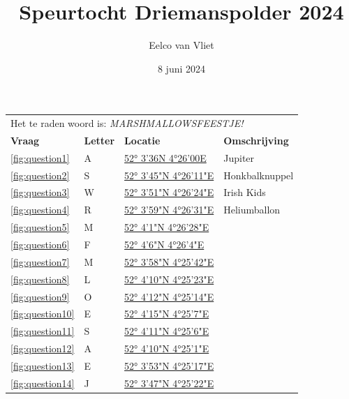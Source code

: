 \documentclass{article}
\title{Speurtocht Driemanspolder 2024}
\author{Eelco van Vliet}
\date{8 juni 2024}
\newcommand{\locone}{52° 3'36N 4°26'00E}
\newcommand{\urlone}{https://forms.gle/88Jf8wcjFSU8aojt8}
\newcommand{\letterone}{A}
\newcommand{\noteone}{Jupiter}
\newcommand{\loctwo}{52° 3'45"N 4°26'11"E}
\newcommand{\urltwo}{https://forms.gle/jwE6WMcVdYzMEdi86}
\newcommand{\lettertwo}{S}
\newcommand{\notetwo}{Honkbalknuppel}
\newcommand{\locthree}{52° 3'51"N 4°26'24"E}
\newcommand{\urlthree}{https://forms.gle/kxh8LWZneB8L2Z3z6}
\newcommand{\letterthree}{W}
\newcommand{\notethree}{Irish Kids}
\newcommand{\locfour}{52° 3'59"N 4°26'31"E}
\newcommand{\urlfour}{https://forms.gle/V9HNHxqCGrrNP5G88}
\newcommand{\letterfour}{R}
\newcommand{\notefour}{Heliumballon}
\newcommand{\locfive}{52° 4'1"N 4°26'28"E}
\newcommand{\urlfive}{https://example.com}
\newcommand{\letterfive}{M}
\newcommand{\notefive}{}
\newcommand{\locsix}{52° 4'6"N 4°26'4"E}
\newcommand{\urlsix}{https://example.com}
\newcommand{\lettersix}{F}
\newcommand{\notesix}{}
\newcommand{\locseven}{52° 3'58"N   4°25'42"E}
\newcommand{\urlseven}{https://example.com}
\newcommand{\letterseven}{M}
\newcommand{\noteseven}{}
\newcommand{\loceight}{52° 4'10"N   4°25'23"E}
\newcommand{\urleight}{https://example.com}
\newcommand{\lettereight}{L}
\newcommand{\noteeight}{}
\newcommand{\locnine}{52° 4'12"N  4°25'14"E}
\newcommand{\urlnine}{https://example.com}
\newcommand{\letternine}{O}
\newcommand{\notenine}{}
\newcommand{\locten}{52° 4'15"N   4°25'7"E}
\newcommand{\urlten}{https://example.com}
\newcommand{\letterten}{E}
\newcommand{\noteten}{}
\newcommand{\loceleven}{52° 4'11"N   4°25'6"E}
\newcommand{\urleleven}{https://example.com}
\newcommand{\lettereleven}{S}
\newcommand{\noteeleven}{}
\newcommand{\loctwelve}{52° 4'10"N   4°25'1"E}
\newcommand{\urltwelve}{https://example.com}
\newcommand{\lettertwelve}{A}
\newcommand{\notetwelve}{}
\newcommand{\locthirteen}{52° 3'53"N   4°25'17"E}
\newcommand{\urlthirteen}{https://example.com}
\newcommand{\letterthirteen}{E}
\newcommand{\notethirteen}{}
\newcommand{\locfourteen}{52° 3'47"N   4°25'22"E}
\newcommand{\urlfourteen}{https://example.com}
\newcommand{\letterfourteen}{J}
\newcommand{\notefourteen}{}
\begin{document}
    \maketitle
        \begin{tabular}{llll}
            \toprule
            \multicolumn{4}{l}{Het te raden woord is: \emph{MARSHMALLOWSFEESTJE!}} \\
            \textbf{Vraag} & \textbf{Letter} & \textbf{Locatie} & \textbf{Omschrijving} \\
            \midrule
             \ref{fig:question1} & \letterone & \href{\urlone}{\locone} & \noteone \\
            \ref{fig:question2} & \lettertwo & \href{\urltwo}{\loctwo} & \notetwo \\
            \ref{fig:question3} & \letterthree & \href{\urlthree}{\locthree} & \notethree  \\
            \ref{fig:question4} & \letterfour  & \href{\urlfour}{\locfour} & \notefour \\
            \ref{fig:question5} & \letterfive  & \href{\urlfive}{\locfive} & \notefive \\
            \ref{fig:question6} & \lettersix  & \href{\urlsix}{\locsix} & \notesix \\
            \ref{fig:question7} & \letterseven  & \href{\urlseven}{\locseven} & \noteseven \\
            \ref{fig:question8} & \lettereight  & \href{\urleight}{\loceight} & \noteeight \\
            \ref{fig:question9} & \letternine  & \href{\urlnine}{\locnine} & \notenine \\
            \ref{fig:question10} & \letterten  & \href{\urlten}{\locten} & \noteten \\
            \ref{fig:question11} & \lettereleven  & \href{\urleleven}{\loceleven} & \noteeleven \\
            \ref{fig:question12} & \lettertwelve  & \href{\urltwelve}{\loctwelve} & \notetwelve \\
            \ref{fig:question13} & \letterthirteen  & \href{\urlthirteen}{\locthirteen} & \notethirteen \\
            \ref{fig:question14} & \letterfourteen  & \href{\urlfourteen}{\locfourteen} & \notefourteen \\

\end{tabular}
\end{document}
